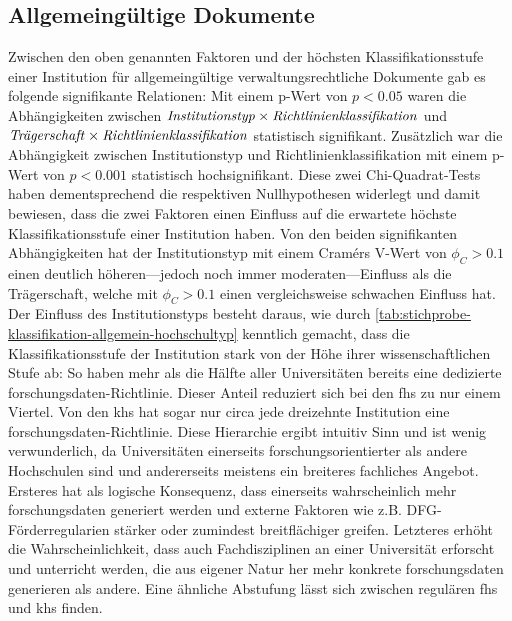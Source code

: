 \subsection{Allgemeingültige Dokumente}
Zwischen den oben genannten Faktoren und der höchsten Klassifikationsstufe einer Institution für allgemeingültige verwaltungsrechtliche Dokumente gab es folgende signifikante Relationen:
Mit einem p-Wert von $p<\num{0,05}$ waren die Abhängigkeiten zwischen $\text{\textit{Institutionstyp}}\times\text{\textit{Richtlinienklassifikation}}$ und $\text{\textit{Trägerschaft}}\times\text{\textit{Richtlinienklassifikation}}$ statistisch signifikant.
Zusätzlich war die Abhängigkeit zwischen Institutionstyp und Richtlinienklassifikation mit einem p-Wert von $p<\num{0,001}$ statistisch hochsignifikant.
Diese zwei Chi-Quadrat-Tests haben dementsprechend die respektiven Nullhypothesen widerlegt und damit bewiesen, dass die zwei Faktoren einen Einfluss auf die erwartete höchste Klassifikationsstufe einer Institution haben.
Von den beiden signifikanten Abhängigkeiten hat der Institutionstyp mit einem Cramérs V-Wert von $\phi_C>\num{0.1}$ einen deutlich höheren---jedoch noch immer moderaten---Einfluss als die Trägerschaft, welche mit $\phi_C>\num{0.1}$ einen vergleichsweise schwachen Einfluss hat.
Der Einfluss des Institutionstyps besteht daraus, wie durch \cref{tab:stichprobe-klassifikation-allgemein-hochschultyp} kenntlich gemacht, dass die Klassifikationsstufe der Institution stark von der Höhe ihrer wissenschaftlichen Stufe ab:
So haben mehr als die Hälfte aller Universitäten bereits eine dedizierte \gls{forschungsdaten}-Richtlinie. 
Dieser Anteil reduziert sich bei den \glspl{fh} zu nur einem Viertel.
Von den \glspl{kh} hat sogar nur circa jede dreizehnte Institution eine \gls{forschungsdaten}-Richtlinie.
Diese Hierarchie ergibt intuitiv Sinn und ist wenig verwunderlich, da Universitäten einerseits forschungsorientierter als andere Hochschulen sind und andererseits meistens ein breiteres fachliches Angebot.
Ersteres hat als logische Konsequenz, dass einerseits wahrscheinlich mehr \gls{forschungsdaten} generiert werden und externe Faktoren wie z.B. DFG-Förderregularien stärker oder zumindest breitflächiger greifen.
Letzteres erhöht die Wahrscheinlichkeit, dass auch Fachdisziplinen an einer Universität erforscht und unterricht werden, die aus eigener Natur her mehr konkrete \gls{forschungsdaten} generieren als andere.
Eine ähnliche Abstufung lässt sich zwischen regulären \glspl{fh} und \glspl{kh} finden.

